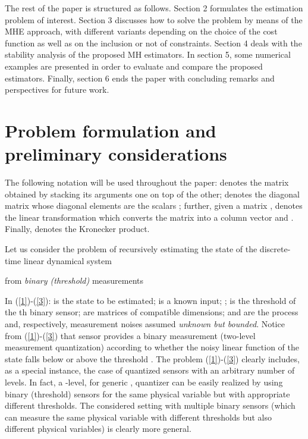 \documentclass[11pt,journal,onecolumn]{IEEEtran}
\begin{document}
The rest of the paper is structured as follows. Section 2 formulates the estimation problem of interest. Section 3 discusses how to solve the problem by means of the MHE approach, with different variants depending on the choice of the cost function as well as on the inclusion or not of constraints. Section 4 deals with the stability analysis of the proposed MH estimators. In section 5, some numerical examples are presented in order to evaluate and compare the proposed estimators. Finally, section 6 ends the paper with concluding remarks and perspectives for future work.

\section{Problem formulation and preliminary considerations}

The following notation will be used throughout the paper:  denotes the matrix obtained by stacking its arguments one on top of the other;  denotes the diagonal matrix whose diagonal elements are the scalars ; further, given a matrix ,  denotes the linear transformation which converts the matrix  into a column vector and
. Finally,  denotes the Kronecker product.

Let us consider the problem of recursively estimating the state of the discrete-time linear dynamical system

from \textit{binary (threshold)} measurements

In (\ref{1})-(\ref{3}):  is the state to be estimated;  is a known input; ;  is the threshold of the th binary sensor;  are matrices of compatible dimensions;  and  are the process and, respectively, measurement noises assumed \textit{unknown but bounded}. Notice from (\ref{1})-(\ref{3}) that sensor  provides a binary measurement  (two-level measurement quantization) according to whether the noisy linear function of the state  falls below or above the threshold . The problem (\ref{1})-(\ref{3}) clearly includes, as a special instance, the case of quantized sensors with an arbitrary number of levels. In fact, a -level, for generic , quantizer can be easily realized by using   binary (threshold) sensors  for the same physical variable but with appropriate different thresholds.
The considered setting with multiple binary sensors (which can measure the same physical variable with different thresholds but also different physical variables) is clearly more general.
\end{document}
